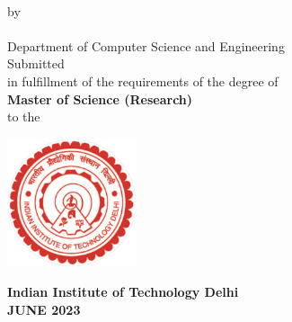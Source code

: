 
\begin{center}


\LARGE
\MakeUppercase{\textbf{\ThesisTitle{}}}\\
\vspace{0.9cm}

\large

{by}\\
\vspace{0.8cm}
\MakeUppercase{\textbf{\Auth{}}}\\
\vspace{.3cm}
{Department of Computer Science and Engineering}\\
\vspace{0.8cm}
{Submitted}\\
\vspace{0.25cm}
{in fulfillment of the requirements of the degree of \\{\bf  Master of Science (Research)}}\\
\vspace{0.8cm}
{to the }\\
\vspace{0.7cm}

\hspace{0cm}
\hbox{\includegraphics[width=9pc]{rest/iitd_logo.pdf}}

\vspace{0.3cm}
{\bf
\large{Indian Institute of Technology Delhi}\\
\large{JUNE 2023}\\
}


\end{center}


